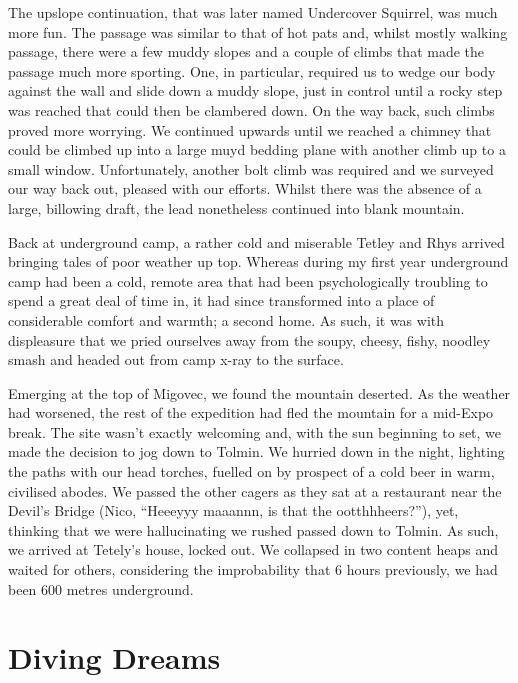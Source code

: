 The upslope continuation, that was later named Undercover Squirrel, was
much more fun. The passage was similar to that of hot pats and, whilst
mostly walking passage, there were a few muddy slopes and a couple of
climbs that made the passage much more sporting. One, in particular,
required us to wedge our body against the wall and slide down a muddy
slope, just in control until a rocky step was reached that could then be
clambered down. On the way back, such climbs proved more worrying. We
continued upwards until we reached a chimney that could be climbed up
into a large muyd bedding plane with another climb up to a small window.
Unfortunately, another bolt climb was required and we surveyed our way
back out, pleased with our efforts. Whilst there was the absence of a
large, billowing draft, the lead nonetheless continued into blank
mountain.

Back at underground camp, a rather cold and miserable Tetley and Rhys
arrived bringing tales of poor weather up top. Whereas during my first
year underground camp had been a cold, remote area that had been
psychologically troubling to spend a great deal of time in, it had since
transformed into a place of considerable comfort and warmth; a second
home. As such, it was with displeasure that we pried ourselves away from
the soupy, cheesy, fishy, noodley smash and headed out from camp x-ray
to the surface.

Emerging at the top of Migovec, we found the mountain deserted. As the
weather had worsened, the rest of the expedition had fled the mountain
for a mid-Expo break. The site wasn't exactly welcoming and, with the
sun beginning to set, we made the decision to jog down to Tolmin. We
hurried down in the night, lighting the paths with our head torches,
fuelled on by prospect of a cold beer in warm, civilised abodes. We
passed the other cagers as they sat at a restaurant near the Devil's
Bridge (Nico, ``Heeeyyy maaannn, is that the ootthhheers?''), yet,
thinking that we were hallucinating we rushed passed down to Tolmin. As
such, we arrived at Tetely's house, locked out. We collapsed in two
content heaps and waited for others, considering the improbability that
6 hours previously, we had been 600 metres underground.


\hypertarget{diving-dreams}{%
\section{Diving Dreams}\label{diving-dreams}}

